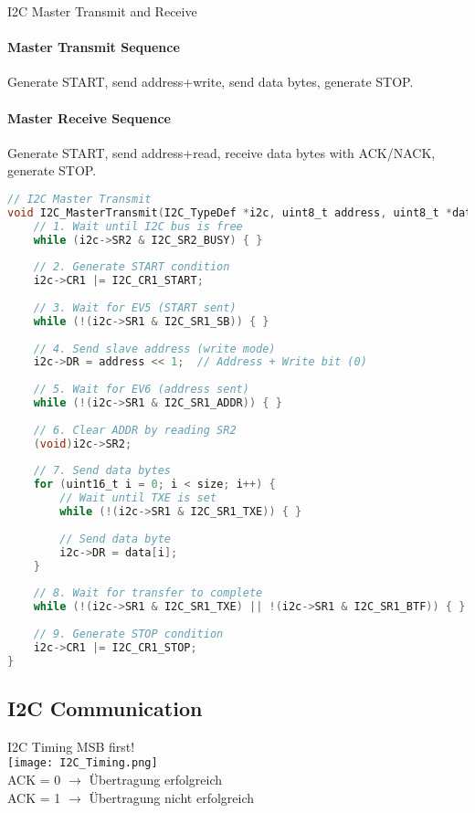 \begin{KR}{I2C Master Transmit and Receive}
\paragraph{Master Transmit Sequence}
Generate START, send address+write, send data bytes, generate STOP.
\paragraph{Master Receive Sequence}
Generate START, send address+read, receive data bytes with ACK/NACK, generate STOP.

\begin{lstlisting}[language=C, style=basesmol]
// I2C Master Transmit
void I2C_MasterTransmit(I2C_TypeDef *i2c, uint8_t address, uint8_t *data, uint16_t size) {
    // 1. Wait until I2C bus is free
    while (i2c->SR2 & I2C_SR2_BUSY) { }
    
    // 2. Generate START condition
    i2c->CR1 |= I2C_CR1_START;
    
    // 3. Wait for EV5 (START sent)
    while (!(i2c->SR1 & I2C_SR1_SB)) { }
    
    // 4. Send slave address (write mode)
    i2c->DR = address << 1;  // Address + Write bit (0)
    
    // 5. Wait for EV6 (address sent)
    while (!(i2c->SR1 & I2C_SR1_ADDR)) { }
    
    // 6. Clear ADDR by reading SR2
    (void)i2c->SR2;
    
    // 7. Send data bytes
    for (uint16_t i = 0; i < size; i++) {
        // Wait until TXE is set
        while (!(i2c->SR1 & I2C_SR1_TXE)) { }
        
        // Send data byte
        i2c->DR = data[i];
    }
    
    // 8. Wait for transfer to complete
    while (!(i2c->SR1 & I2C_SR1_TXE) || !(i2c->SR1 & I2C_SR1_BTF)) { }
    
    // 9. Generate STOP condition
    i2c->CR1 |= I2C_CR1_STOP;
}
\end{lstlisting}
\end{KR}

\subsection{I2C Communication}

\begin{concept}{I2C Timing} MSB first!\\
    \texttt{[image: I2C\_Timing.png]}\\
    ACK = 0 $\rightarrow$ Übertragung erfolgreich\\
    ACK = 1 $\rightarrow$ Übertragung nicht erfolgreich
\end{concept}


